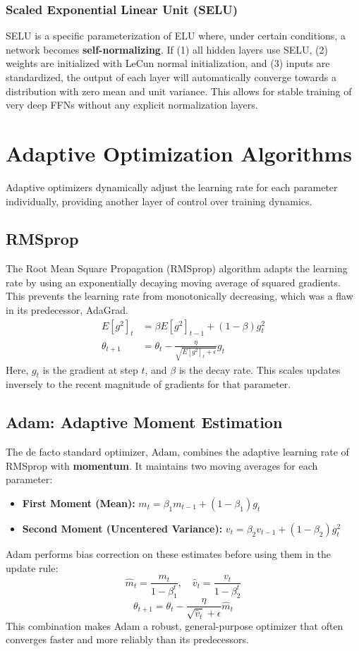\documentclass{article}
\begin{document}
\subsubsection{Scaled Exponential Linear Unit (SELU)}
SELU is a specific parameterization of ELU where, under certain conditions, a network becomes \textbf{self-normalizing}. If (1) all hidden layers use SELU, (2) weights are initialized with LeCun normal initialization, and (3) inputs are standardized, the output of each layer will automatically converge towards a distribution with zero mean and unit variance. This allows for stable training of very deep FFNs without any explicit normalization layers.

\section{Adaptive Optimization Algorithms}
Adaptive optimizers dynamically adjust the learning rate for each parameter individually, providing another layer of control over training dynamics.

\subsection{RMSprop}
The Root Mean Square Propagation (RMSprop) algorithm adapts the learning rate by using an exponentially decaying moving average of squared gradients. This prevents the learning rate from monotonically decreasing, which was a flaw in its predecessor, AdaGrad.
\begin{align}
E[g^2]_t &= \beta E[g^2]_{t-1} + (1-\beta)g_t^2 \\
\theta_{t+1} &= \theta_t - \frac{\eta}{\sqrt{E[g^2]_t + \epsilon}} g_t
\end{align}
Here, $g_t$ is the gradient at step $t$, and $\beta$ is the decay rate. This scales updates inversely to the recent magnitude of gradients for that parameter.

\subsection{Adam: Adaptive Moment Estimation}
The de facto standard optimizer, Adam, combines the adaptive learning rate of RMSprop with \textbf{momentum}. It maintains two moving averages for each parameter:
\begin{itemize}
    \item \textbf{First Moment (Mean):} $m_t = \beta_1 m_{t-1} + (1-\beta_1)g_t$
    \item \textbf{Second Moment (Uncentered Variance):} $v_t = \beta_2 v_{t-1} + (1-\beta_2)g_t^2$
\end{itemize}
Adam performs bias correction on these estimates before using them in the update rule:
\begin{equation}
\hat{m}_t = \frac{m_t}{1-\beta_1^t}, \quad \hat{v}_t = \frac{v_t}{1-\beta_2^t}
\end{equation}
\begin{equation}
\theta_{t+1} = \theta_t - \frac{\eta}{\sqrt{\hat{v}_t} + \epsilon} \hat{m}_t
\end{equation}
This combination makes Adam a robust, general-purpose optimizer that often converges faster and more reliably than its predecessors.
\end{document}
